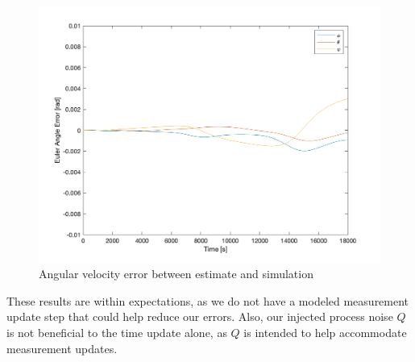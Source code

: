 \begin{figure}[H]
\centering
\includegraphics[scale=0.6]{Images/ps7_problem6_angle_err.png}
\caption{Angular velocity error between estimate and simulation}
\label{fig:ps7_problem6_angle_err}
\end{figure}

These results are within expectations, as we do not have a modeled measurement update step that could help reduce our errors. Also, our injected process noise $Q$ is not beneficial to the time update alone, as $Q$ is intended to help accommodate measurement updates.